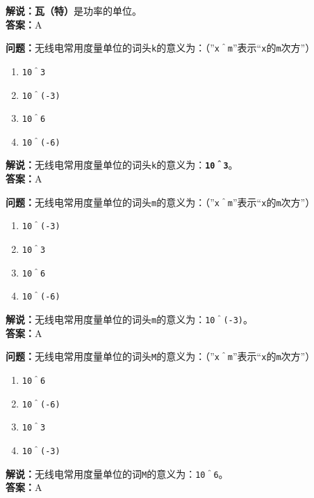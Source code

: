 \textbf{解说：瓦（特）}是功率的单位。\\\textbf{答案：}A



\textbf{问题：}无线电常用度量单位的词头\texttt{k}的意义为：（”\texttt{x＾m}”表示“\texttt{x}的\texttt{m}次方”）

\begin{enumerate}[label=\Alph*), leftmargin=1cm]
	\item \texttt{10＾3}
	\item \texttt{10＾(-3)}
	\item \texttt{10＾6}
	\item \texttt{10＾(-6)}
\end{enumerate}

\textbf{解说：}无线电常用度量单位的词头\texttt{k}的意义为：\textbf{\texttt{10＾3}}。\\\textbf{答案：}A



\textbf{问题：}无线电常用度量单位的词头\texttt{m}的意义为：（”\texttt{x＾m}”表示“\texttt{x}的\texttt{m}次方”）

\begin{enumerate}[label=\Alph*), leftmargin=1cm]
	\item \texttt{10＾(-3)}
	\item \texttt{10＾3}
	\item \texttt{10＾6}
	\item \texttt{10＾(-6)}
\end{enumerate}

\textbf{解说：}无线电常用度量单位的词头\texttt{m}的意义为：\texttt{10＾(-3)}。\\\textbf{答案：}A



\textbf{问题：}无线电常用度量单位的词头\texttt{M}的意义为：（”\texttt{x＾m}”表示“\texttt{x}的\texttt{m}次方”）

\begin{enumerate}[label=\Alph*), leftmargin=1cm]
	\item \texttt{10＾6}
	\item \texttt{10＾(-6)}
	\item \texttt{10＾3}
	\item \texttt{10＾(-3)}
\end{enumerate}

\textbf{解说：}无线电常用度量单位的词\texttt{M}的意义为：\texttt{10＾6}。\\\textbf{答案：}A



